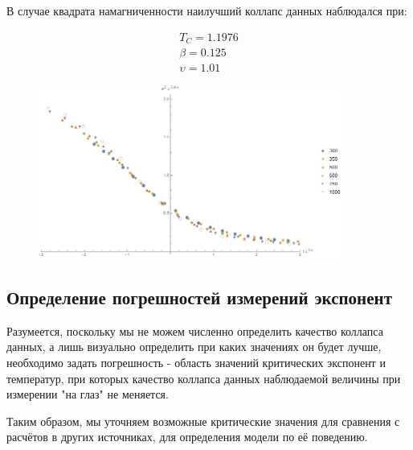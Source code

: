 В случае квадрата намагниченности наилучший коллапс данных наблюдался при:

\begin{align*}
    T_{C} = 1.1976 \\
    \beta = 0.125 \\
    \upsilon = 1.01
\end{align*}

\begin{figure}[!h]
    \centering
    \includegraphics[width=100mm]{Sections/Images/DatColMagn2_3.png}
    \label{fig:DatColM2_3}
\end{figure}

\subsection{Определение погрешностей измерений экспонент}

Разумеется, поскольку мы не можем численно определить качество коллапса данных, а лишь визуально определить при каких значениях он будет лучше, необходимо задать погрешность - область значений критических экспонент и температур, при которых качество коллапса данных наблюдаемой величины при измерении "на глаз" не меняется.

Таким образом, мы уточняем возможные критические значения для сравнения с расчётов в других источниках, для определения модели по её поведению.

